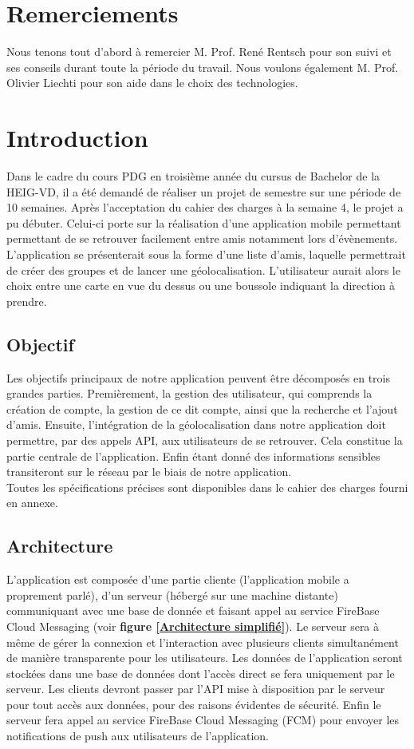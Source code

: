 \documentclass[french]{article}
\begin{document}
	\newpage
	
	\section*{Remerciements}
	Nous tenons tout d'abord à remercier M. Prof. René Rentsch pour son suivi et ses conseils durant toute la période du travail. Nous voulons également M. Prof. Olivier Liechti pour son aide dans le choix des technologies.
	
	\section{Introduction}
	Dans le cadre du cours PDG en troisième année du cursus de Bachelor de la HEIG-VD, il a été demandé de réaliser un projet de semestre sur une période de 10 semaines. Après l'acceptation du cahier des charges à la semaine 4, le projet a pu débuter. Celui-ci porte sur la réalisation d'une application mobile permettant permettant de se retrouver facilement entre amis notamment lors d'évènements. L’application se présenterait sous la forme d’une liste d’amis, laquelle permettrait de créer des groupes et de lancer une géolocalisation. L’utilisateur aurait alors le choix entre une carte en vue du dessus ou une boussole indiquant la direction à
	prendre.
	
		\subsection{Objectif}
		Les objectifs principaux de notre application peuvent être décomposés en trois grandes parties. Premièrement, la gestion des utilisateur, qui comprends la création de compte, la gestion de ce dit compte, ainsi que la recherche et l'ajout d'amis. Ensuite, l'intégration de la géolocalisation dans notre application doit permettre, par des appels API, aux utilisateurs de se retrouver. Cela constitue la partie centrale de l'application. Enfin étant donné des informations sensibles transiteront sur le réseau par le biais de notre application.\\
		Toutes les spécifications précises sont disponibles dans le cahier des charges fourni en annexe.
		
		\subsection{Architecture}
		L’application est composée d’une partie cliente (l'application mobile a proprement parlé), d’un serveur (hébergé sur une machine distante) communiquant avec une base de donnée et faisant appel au service FireBase Cloud Messaging (voir \textbf{figure \ref{Architecture simplifié}}). Le serveur sera à même de gérer la connexion et l’interaction avec plusieurs clients simultanément de manière transparente pour les utilisateurs. 
		Les données de l’application seront stockées dans une base de données dont l’accès direct se fera uniquement par le serveur. Les clients devront passer par l'API mise à disposition par le serveur pour tout accès aux données, pour des raisons évidentes de sécurité.
		Enfin le serveur fera appel au service FireBase Cloud Messaging (FCM) pour envoyer les notifications de push aux utilisateurs de l'application. 
		
\end{document}
